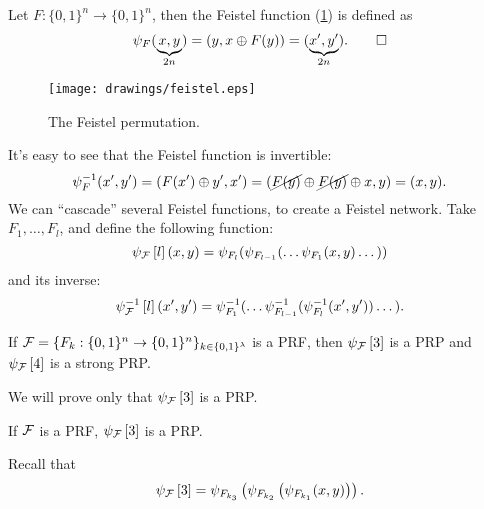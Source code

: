 \begin{definition}
	Let $F: \{0,1\}^n \to \{0,1\}^n$, then the Feistel function (\cref{fig:feistel}) is defined as
	\begin{equation*}
		\Feistel(\underbrace{x,y}_{2n}) = (y, x \xor F(y)) = (\underbrace{x', y'}_{2n}). \qedhere
	\end{equation*}
	\begin{figure}
		\centering
		\texttt{[image: drawings/feistel.eps]}
		\caption{The Feistel permutation.}
		\label{fig:feistel}
	\end{figure}
\end{definition}

It's easy to see that the Feistel function is invertible:
\begin{equation*}
	\Feistel^{-1} (x', y') = (F(x') \xor y', x') = (\cancel{F(y)} \xor \cancel{F(y)} \xor x, y) = (x, y).
\end{equation*}
We can ``cascade'' several Feistel functions, to create a Feistel network.
Take $F_1, \dots, F_l$, and define the following function:
\begin{equation*}
	\Feistel[\F]\left[l\right] (x,y) = \Feistel[F_l](\Feistel[F_{l-1}]( \dots \Feistel[F_{1}](x,y) \dots))
\end{equation*}
and its inverse:
\begin{equation*}
	\Feistel[\F]^{-1}\left[l\right] (x',y') = \Feistel[F_1]^{-1}(\dots \Feistel[F_{l-1}]^{-1}(\Feistel[F_{l}]^{-1}(x',y')) \dots).
\end{equation*}

\begin{theorem}
	If $\F = \{F_k : \{0,1\}^{n} \to \{0,1\}^{n}\}_{k \in \{0,1\}^{\lambda}}$ is a \ac{PRF}, then $\Feistel[\F]\left[3\right]$ is a \ac{PRP} and $\Feistel[\F]\left[4\right]$ is a strong \ac{PRP}.
\end{theorem}

We will prove only that $\Feistel[\F]\left[3\right]$ is a \ac{PRP}.
\begin{theorem} \label{thm:feistel-3-prp}
	If $\F$ is a \ac{PRF}, $\Feistel[\F]\left[3\right]$ is a \ac{PRP}.
\end{theorem}
Recall that 
\begin{equation*}
	\Feistel[\F]\left[3\right] =
	\Feistel[F_{k_3}] \left( \Feistel[F_{k_2}] \left( \Feistel[F_{k_1}] (x,y) \right) \right).
\end{equation*}

